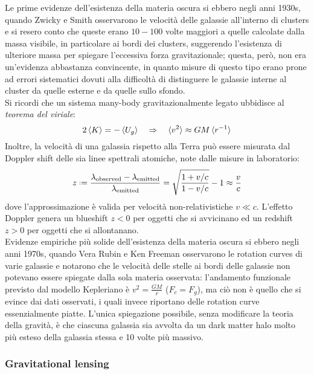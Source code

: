 Le prime evidenze dell'esistenza della materia oscura si ebbero negli anni 1930s, quando Zwicky e Smith osservarono le velocità delle galassie all'interno di clusters e si resero conto che queste erano $ 10-100 $ volte maggiori a quelle calcolate dalla massa visibile, in particolare ai bordi dei clusters, suggerendo l'esistenza di ulteriore massa per spiegare l'eccessiva forza gravitazionale; questa, però, non era un'evidenza abbastanza convincente, in quanto misure di questo tipo erano prone ad errori sistematici dovuti alla difficoltà di distinguere le galassie interne al cluster da quelle esterne e da quelle sullo sfondo.\\
Si ricordi che un sistema many-body gravitazionalmente legato ubbidisce al \textit{teorema del viriale}:
\begin{equation}
	2 \braket{K} = - \braket{U_g}
	\quad \Rightarrow \quad
	\braket{v^2} \approx G M \braket{r^{-1}}
	\label{eq:11.1}
\end{equation}
Inoltre, la velocità di una galassia rispetto alla Terra può essere misurata dal Doppler shift delle sia linee spettrali atomiche, note dalle misure in laboratorio:
\begin{equation}
	z \defeq \frac{\lambda_{\text{observed}} - \lambda_{\text{emitted}}}{\lambda_{\text{emitted}}} = \sqrt{\frac{1 + v/c}{1 - v/c}} - 1 \approx \frac{v}{c}
	\label{eq:11.2}
\end{equation}
dove l'approssimazione è valida per velocità non-relativistiche $ v \ll c $. L'effetto Doppler genera un blueshift $ z < 0 $ per oggetti che si avvicinano ed un redshift $ z > 0 $ per oggetti che si allontanano.\\
Evidenze empiriche più solide dell'esistenza della materia oscura si ebbero negli anni 1970s, quando Vera Rubin e Ken Freeman osservarono le rotation curves di varie galassie e notarono che le velocità delle stelle ai bordi delle galassie non potevano essere spiegate dalla sola materia osservata: l'andamento funzionale previsto dal modello Kepleriano è $ v^2 = \frac{GM}{r} $ ($ F_c = F_g $), ma ciò non è quello che si evince dai dati osservati, i quali invece riportano delle rotation curve essenzialmente piatte. L'unica spiegazione possibile, senza modificare la teoria della gravità, è che ciascuna galassia sia avvolta da un dark matter halo molto più esteso della galassia stessa e 10 volte più massivo.

\subsubsection{Gravitational lensing}

